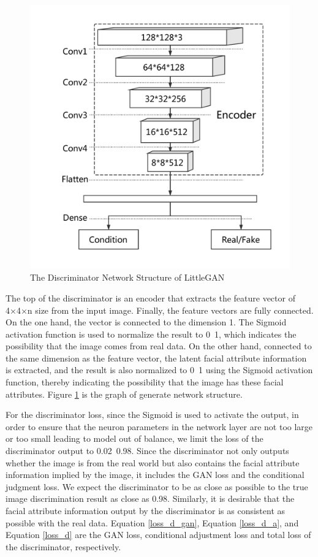 \begin{figure}
\begin{minipage}[t]{0.48\linewidth}
        \includegraphics[width=\textwidth]{figures/net_discriminator.pdf}
        \caption{The Discriminator Network Structure of LittleGAN}
        \label{net_discriminator}
    \end{minipage}
\end{figure}

The top of the discriminator is an encoder that extracts the feature vector of 4×4×n size from the input image.
Finally, the feature vectors are fully connected.
On the one hand, the vector is connected to the dimension 1.
The Sigmoid activation function is used to normalize the result to 0~1,
    which indicates the possibility that the image comes from real data.
On the other hand, connected to the same dimension as the feature vector,
    the latent facial attribute information is extracted,
    and the result is also normalized to 0~1 using the Sigmoid activation function,
    thereby indicating the possibility that the image has these facial attributes.
Figure \ref{net_discriminator} is the graph of generate network structure.


For the discriminator loss, since the Sigmoid is used to activate the output,
    in order to ensure that the neuron parameters in the network layer are not too large or too small leading to model out of balance,
    we limit the loss of the discriminator output to 0.02~0.98.
Since the discriminator not only outputs whether the image is from the real world but also contains the facial attribute information implied by the image,
    it includes the GAN loss and the conditional judgment loss.
We expect the discriminator to be as close as possible to the true image discrimination result as close as 0.98.
Similarly, it is desirable that the facial attribute information output by the discriminator is as consistent as possible with the real data.
Equation \eqref{loss_d_gan}, Equation \eqref{loss_d_a}, and Equation \eqref{loss_d} are the GAN loss, conditional adjustment loss and total loss of the discriminator, respectively.


